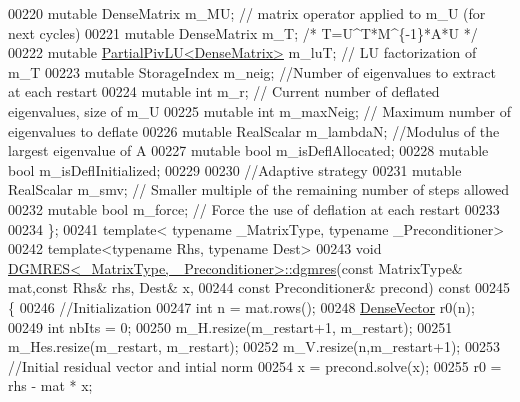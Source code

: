 \begin{DoxyCode}
00220     \textcolor{keyword}{mutable} DenseMatrix m\_MU; \textcolor{comment}{// matrix operator applied to m\_U (for next cycles)}
00221     \textcolor{keyword}{mutable} DenseMatrix m\_T; \textcolor{comment}{/* T=U^T*M^\{-1\}*A*U */}
00222     \textcolor{keyword}{mutable} \hyperlink{group___l_u___module_class_eigen_1_1_partial_piv_l_u}{PartialPivLU<DenseMatrix>} m\_luT; \textcolor{comment}{// LU factorization of m\_T}
00223     \textcolor{keyword}{mutable} StorageIndex m\_neig; \textcolor{comment}{//Number of eigenvalues to extract at each restart}
00224     \textcolor{keyword}{mutable} \textcolor{keywordtype}{int} m\_r; \textcolor{comment}{// Current number of deflated eigenvalues, size of m\_U}
00225     \textcolor{keyword}{mutable} \textcolor{keywordtype}{int} m\_maxNeig; \textcolor{comment}{// Maximum number of eigenvalues to deflate}
00226     \textcolor{keyword}{mutable} RealScalar m\_lambdaN; \textcolor{comment}{//Modulus of the largest eigenvalue of A}
00227     \textcolor{keyword}{mutable} \textcolor{keywordtype}{bool} m\_isDeflAllocated;
00228     \textcolor{keyword}{mutable} \textcolor{keywordtype}{bool} m\_isDeflInitialized;
00229     
00230     \textcolor{comment}{//Adaptive strategy }
00231     \textcolor{keyword}{mutable} RealScalar m\_smv; \textcolor{comment}{// Smaller multiple of the remaining number of steps allowed}
00232     \textcolor{keyword}{mutable} \textcolor{keywordtype}{bool} m\_force; \textcolor{comment}{// Force the use of deflation at each restart}
00233     
00234 \}; 
00241 \textcolor{keyword}{template}< \textcolor{keyword}{typename} \_MatrixType, \textcolor{keyword}{typename} \_Preconditioner>
00242 \textcolor{keyword}{template}<\textcolor{keyword}{typename} Rhs, \textcolor{keyword}{typename} Dest>
00243 \textcolor{keywordtype}{void} \hyperlink{class_eigen_1_1_d_g_m_r_e_s_a1b06062ec16932d3a20ea4767d9de51d}{DGMRES<\_MatrixType, \_Preconditioner>::dgmres}(\textcolor{keyword}{const} 
      MatrixType& mat,\textcolor{keyword}{const} Rhs& rhs, Dest& x,
00244               \textcolor{keyword}{const} Preconditioner& precond)\textcolor{keyword}{ const}
00245 \textcolor{keyword}{}\{
00246   \textcolor{comment}{//Initialization}
00247   \textcolor{keywordtype}{int} n = mat.rows(); 
00248   \hyperlink{group___core___module}{DenseVector} r0(n); 
00249   \textcolor{keywordtype}{int} nbIts = 0; 
00250   m\_H.resize(m\_restart+1, m\_restart);
00251   m\_Hes.resize(m\_restart, m\_restart);
00252   m\_V.resize(n,m\_restart+1);
00253   \textcolor{comment}{//Initial residual vector and intial norm}
00254   x = precond.solve(x);
00255   r0 = rhs - mat * x; 

\end{DoxyCode}
